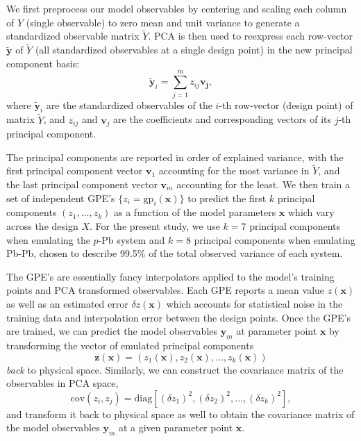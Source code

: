 \documentclass[aps,prc,reprint,amsmath,nofootinbib]{revtex4-1}
\newcommand{\x}{\mathbf{x}}
\newcommand{\y}{\mathbf{y}}
\begin{document}
We first preprocess our model observables by centering and scaling each column of $Y$ (single observable) to zero mean and unit variance to generate a standardized observable matrix $\tilde{Y}$.
PCA is then used to reexpress each row-vector $\tilde{\y}$ of $\tilde{Y}$ (all standardized observables at a single design point) in the new principal component basis:
\begin{equation}
  \tilde{\y}_i = \sum\limits_{j=1}^m z_{ij} \mathbf{v_j},
\end{equation}
where $\tilde{\y}_i$ are the standardized observables of the $i$-th row-vector (design point) of matrix $\tilde{Y}$, and $z_{ij}$ and $\mathbf{v}_j$ are the coefficients and corresponding vectors of its $j$-th principal component.

The principal components are reported in order of explained variance, with the first principal component vector $\mathbf{v}_1$ accounting for the most variance in $\tilde{Y}$, and the last principal component vector $\mathbf{v}_m$ accounting for the least.
We then train a set of independent GPE's $\{z_i=\mathrm{gp}_i(\x)\}$ to predict the first $k$ principal components $(z_1, \dots, z_k)$ as a function of the model parameters $\x$ which vary across the design $X$.
For the present study, we use $k=7$ principal components when emulating the $p$-Pb system and $k=8$ principal components when emulating Pb-Pb, chosen to describe 99.5\% of the total observed variance of each system.

The GPE's are essentially fancy interpolators applied to the model's training points and PCA transformed observables.
Each GPE reports a mean value $z(\x)$ as well as an estimated error $\delta z(\x)$ which accounts for statistical noise in the training data and interpolation error between the design points.
Once the GPE's are trained, we can predict the model observables $\y_m$ at parameter point $\x$ by transforming the vector of emulated principal components
\begin{equation}
  \mathbf{z}(\x) = (z_1(\x), z_2(\x), \dots, z_k(\x))
\end{equation}
\emph{back} to physical space.
Similarly, we can construct the covariance matrix of the observables in PCA space,
\begin{equation}
\mathrm{cov}(z_i, z_j) = \mathrm{diag}[(\delta z_{1})^2, (\delta z_2)^2, \dots, (\delta z_k)^2 ],
\end{equation}
and transform it back to physical space as well to obtain the covariance matrix of the model observables $\y_m$ at a given parameter point $\x$.
\end{document}
